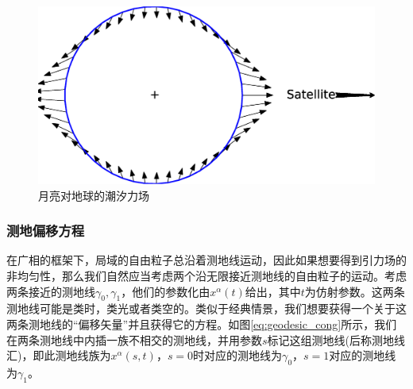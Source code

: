 \documentclass[hyperref, UTF8, a4paper]{ctexart}
\begin{document}
\begin{figure}[h]
	\centering
	\includegraphics[scale=0.3]{tidal_of_moon.eps}
	\caption{月亮对地球的潮汐力场}
	\label{fig:tidal_of_moon}
\end{figure}
\subsubsection{测地偏移方程}
在广相的框架下，局域的自由粒子总沿着测地线运动，因此如果想要得到引力场的非均匀性，那么我们自然应当考虑两个沿无限接近测地线的自由粒子的运动。考虑两条接近的测地线$\gamma _{0} ,\gamma _{1}$，他们的参数化由$x^{\alpha }( t)$给出，其中$t$为仿射参数。这两条测地线可能是类时，类光或者类空的。类似于经典情景，我们想要获得一个关于这两条测地线的“偏移矢量”并且获得它的方程。如图\ref{eq:geodesic_cong}所示，我们在两条测地线中内插一族不相交的测地线，并用参数$s$标记这组测地线(后称测地线汇)，即此测地线族为$x^{\alpha }( s,t)$，$s=0$时对应的测地线为$\gamma _{0}$，$s=1$对应的测地线为$\gamma _{1}$。
\end{document}
